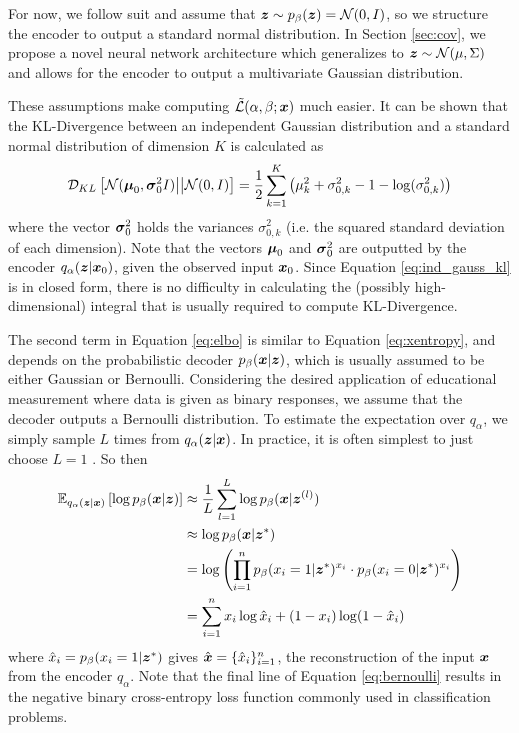 For now, we follow suit and assume that $\boldsymbol{z} \sim p_\beta(\boldsymbol{z}) = \mathcal{N}(0,I)$, so we structure the encoder to output a standard normal distribution. In Section \ref{sec:cov}, we propose a novel neural network architecture which generalizes to $\boldsymbol{z} \sim \mathcal{N}(\mu, \Sigma)$ and allows for the encoder to output a multivariate Gaussian distribution.

These assumptions make computing $\tilde{\mathcal{L}}(\alpha,\beta;\boldsymbol{x})$ much easier. It can be shown \cite{doersch2016} that the KL-Divergence between an independent Gaussian distribution and a standard normal distribution of dimension $K$ is calculated as
\begin{equation}
  \mathcal{D}_{KL}\left[ \mathcal{N}(\boldsymbol{\mu}_0, \boldsymbol{\sigma}_0^2I) \big|\big| \mathcal{N}(0,I) \right] = \frac{1}{2}\sum_{k=1}^K \left( \mu_k^2 + \sigma_{0,k}^2 - 1 - \log(\sigma_{0,k}^2)\right)
  \label{eq:ind_gauss_kl}
\end{equation}
where the vector $\boldsymbol{\sigma}_0^2$ holds the variances $\sigma_{0,k}^2$ (i.e. the squared standard deviation of each dimension). Note that the vectors $\boldsymbol{\mu}_0$ and $\boldsymbol{\sigma}_0^2$ are outputted by the encoder $q_\alpha(\boldsymbol{z} | \boldsymbol{x}_0)$, given the observed input $\boldsymbol{x}_0$. Since Equation \ref{eq:ind_gauss_kl} is in closed form, there is no difficulty in calculating the (possibly high-dimensional) integral that is usually required to compute KL-Divergence.

The second term in Equation \ref{eq:elbo} is similar to Equation \ref{eq:xentropy}, and depends on the probabilistic decoder $p_\beta(\boldsymbol{x} | \boldsymbol{z})$, which is usually assumed to be either Gaussian or Bernoulli. Considering the desired application of educational measurement where data is given as binary responses, we assume that the decoder outputs a Bernoulli distribution. To estimate the expectation over $q_\alpha$, we simply sample $L$ times from $q_\alpha(\boldsymbol{z} | \boldsymbol{x})$. In practice, it is often simplest to just choose $L=1$ \cite{kingma2014}. So then 
\begin{equation}
  \begin{split}
    \mathbb{E}_{q_\alpha(\boldsymbol{z} | \boldsymbol{x})} \left[ \log p_\beta(\boldsymbol{x} | \boldsymbol{z}) \right] &\approx \frac{1}{L}\sum_{l=1}^L \log p_\beta(\boldsymbol{x} | \boldsymbol{z}^{(l)}) \\
    &\approx \log p_\beta(\boldsymbol{x}| \boldsymbol{z}^*) \\
    &= \log\left( \prod_{i=1}^n p_\beta(x_i = 1 | \boldsymbol{z}^*)^{x_i} \cdot p_\beta(x_i=0 | \boldsymbol{z}^*)^{x_i} \right) \\
  &= \sum_{i=1}^n x_i\log \hat x_i + (1-x_i)\log (1-\hat x_i)
  \end{split}
  \label{eq:bernoulli}
\end{equation}
where $\hat x_i = p_\beta(x_i=1 | \boldsymbol{z}^*)$ gives $\hat{\boldsymbol{x}} = \{\hat x_i\}_{i=1}^n$, the reconstruction of the input $\boldsymbol{x}$ from the encoder $q_\alpha$. Note that the final line of Equation \ref{eq:bernoulli} results in the negative binary cross-entropy loss function commonly used in classification problems.

